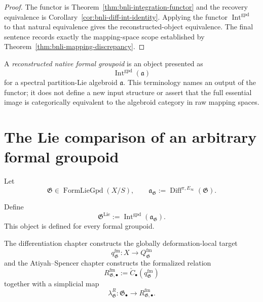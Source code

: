 \begin{proof}
The functor is Theorem~\ref{thm:bnli-integration-functor} and the recovery
equivalence is Corollary~\ref{cor:bnli-diff-int-identity}.  Applying the functor
$\operatorname{Int}^{\mathrm{gpd}}$ to that natural equivalence gives the
reconstructed-object equivalence.  The final sentence records exactly the
mapping-space scope established by Theorem~\ref{thm:bnli-mapping-discrepancy}.
\end{proof}

\begin{definition}
\label{def:bnli-reconstructed-groupoid}
A \emph{reconstructed native formal groupoid} is an object presented as
\[
    \operatorname{Int}^{\mathrm{gpd}}(\mathfrak a)
\]
for a spectral partition-Lie algebroid $\mathfrak a$.  This terminology names
an output of the functor; it does not define a new input structure or assert
that the full essential image is categorically equivalent to the algebroid
category in raw mapping spaces.
\end{definition}

\section{The Lie comparison of an arbitrary formal groupoid}
\label{sec:bnli-completion}

Let
\[
    \mathfrak G\in\operatorname{FormLieGpd}(X/S),
    \qquad
    \mathfrak a_{\mathfrak G}
    :=
    \operatorname{Diff}^{\pi,E_\infty}(\mathfrak G).
\]

\begin{definition}
\label{def:bnli-lie-completion}
Define
\[
\boxed{
    \mathfrak G^{\mathrm{Lie}}
    :=
    \operatorname{Int}^{\mathrm{gpd}}
    (\mathfrak a_{\mathfrak G}).}
\]
This object is defined for every formal groupoid.
\end{definition}

The differentiation chapter constructs the globally deformation-local target
\[
    q_{\mathfrak G}^{\mathrm{fm}}:
    X\longrightarrow Q_{\mathfrak G}^{\mathrm{fm}}
\]
and the Atiyah--Spencer chapter constructs the formalized relation
\[
    R_{\mathfrak G,\bullet}^{\mathrm{fm}}
    :=
    \check C_\bullet(q_{\mathfrak G}^{\mathrm{fm}})
\]
together with a simplicial map
\[
    \lambda^R_{\mathfrak G}:
    \mathfrak G_\bullet
    \longrightarrow
    R_{\mathfrak G,\bullet}^{\mathrm{fm}}.
\]

